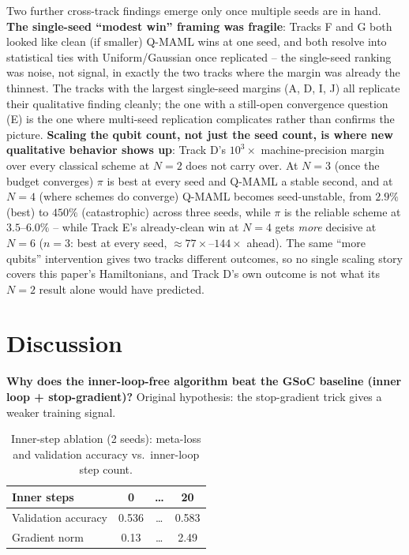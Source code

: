 \documentclass[11pt]{article}
\begin{document}
Two further cross-track findings emerge only once multiple seeds are in hand. \textbf{The single-seed
``modest win'' framing was fragile}: Tracks F and G both looked like clean (if smaller) Q-MAML wins at one
seed, and both resolve into statistical ties with Uniform/Gaussian once replicated -- the single-seed
ranking was noise, not signal, in exactly the two tracks where the margin was already the thinnest. The
tracks with the largest single-seed margins (A, D, I, J) all replicate their qualitative finding cleanly;
the one with a still-open convergence question (E) is the one where multi-seed replication complicates
rather than confirms the picture. \textbf{Scaling the qubit count, not just the seed count, is where new
qualitative behavior shows up}: Track D's $10^3\times$ machine-precision margin over every classical scheme
at $N{=}2$ does not carry over. At $N{=}3$ (once the budget converges) $\pi$ is best at every seed and Q-MAML a stable second, and at $N{=}4$
(where schemes do converge) Q-MAML becomes seed-unstable, from $2.9\%$ (best) to $450\%$ (catastrophic)
across three seeds, while $\pi$ is the reliable scheme at $3.5$--$6.0\%$ -- while Track E's already-clean
win at $N{=}4$ gets \emph{more} decisive at $N{=}6$ ($n{=}3$: best at every seed, $\approx77\times$--$144\times$ ahead). The same ``more qubits''
intervention gives two tracks different outcomes, so no single scaling story covers this paper's
Hamiltonians, and Track D's own outcome is not what its $N{=}2$ result alone would have predicted.

\FloatBarrier
\section{Discussion}

\textbf{Why does the inner-loop-free algorithm beat the GSoC baseline (inner loop + stop-gradient)?}
Original hypothesis: the stop-gradient trick gives a weaker training signal.

\begin{table}[ht]
\centering
\caption{Inner-step ablation (2 seeds): meta-loss and validation accuracy vs.\ inner-loop step count.}
\label{tab:ablation}
\begin{tabular}{lccc}
\toprule
Inner steps & 0 & \dots & 20 \\
\midrule
Validation accuracy & 0.536 & \dots & 0.583 \\
Gradient norm & 0.13 & \dots & 2.49 \\
\bottomrule
\end{tabular}
\end{table}
\end{document}
